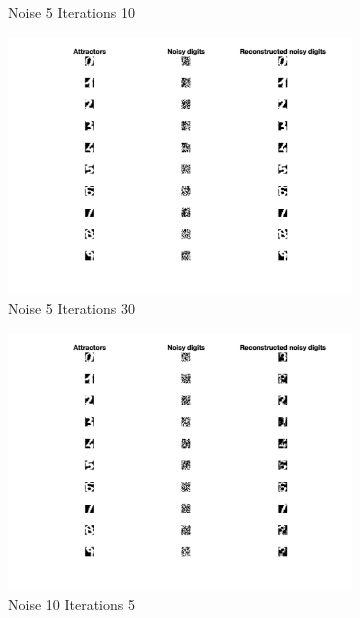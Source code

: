 \documentclass[11pt,conference,compsoc]{IEEEtran}
\begin{document}
\begin{figure}[]
\begin{subfigure}{0.32\linewidth}
        \caption{Noise 5 Iterations 10}
    \end{subfigure}
    \begin{subfigure}{0.32\linewidth}
        \includegraphics[width=\linewidth]{images/noise5_iter30.png}
        \caption{Noise 5 Iterations 30}
    \end{subfigure}
    \begin{subfigure}{0.32\linewidth}
        \includegraphics[width=\linewidth]{images/noise10_iter5.png}
        \caption{Noise 10 Iterations 5}
    \end{subfigure}
    \begin{subfigure}{0.32\linewidth}

\end{subfigure}
\end{figure}
\end{document}
